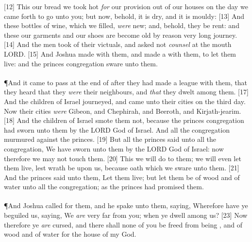 [12] \textcolor[cmyk]{0.99998,1,0,0}{This our bread we took hot \emph{for} our provision out of our houses on the day we came forth to go unto you; but now, behold, it is dry, and it is mouldy:}
[13] \textcolor[cmyk]{0.99998,1,0,0}{And these bottles of wine, which we filled, \emph{were} new; and, behold, they be rent: and these our garments and our shoes are become old by reason  very long journey.}
[14] \textcolor[cmyk]{0.99998,1,0,0}{And the men took of their victuals, and asked not \emph{counsel} at the mouth  LORD.}
[15] \textcolor[cmyk]{0.99998,1,0,0}{And Joshua made  with them, and made a  with them, to let them live: and the princes  congregation sware unto them.}\\
\\
\P \textcolor[cmyk]{0.99998,1,0,0}{And it came to pass at the end of  after they had made a league with them, that they heard that they \emph{were} their neighbours, and \emph{that} they dwelt among them.}
[17] \textcolor[cmyk]{0.99998,1,0,0}{And the children of Israel journeyed, and came unto their cities on the third day. Now their cities \emph{were} Gibeon, and Chephirah, and Beeroth, and Kirjath-jearim.}
[18] \textcolor[cmyk]{0.99998,1,0,0}{And the children of Israel smote them not, because the princes  congregation had sworn unto them by the LORD God of Israel. And all the congregation murmured against the princes.}
[19] \textcolor[cmyk]{0.99998,1,0,0}{But all the princes said unto all the congregation, We have sworn unto them by the LORD God of Israel: now therefore we may not touch them.}
[20] \textcolor[cmyk]{0.99998,1,0,0}{This we will do to them; we will even let them live, lest wrath be upon us, because  oath which we sware unto them.}
[21] \textcolor[cmyk]{0.99998,1,0,0}{And the princes said unto them, Let them live; but let them be  of wood and  of water unto all the congregation; as the princes had promised them.}\\
\\
\P \textcolor[cmyk]{0.99998,1,0,0}{And Joshua called for them, and he spake unto them, saying, Wherefore have ye beguiled us, saying, We \emph{are} very far from you; when ye dwell among us?}
[23] \textcolor[cmyk]{0.99998,1,0,0}{Now therefore ye \emph{are} cursed, and there shall none of you be freed from being , and  of wood and  of water for the house of my God.}
